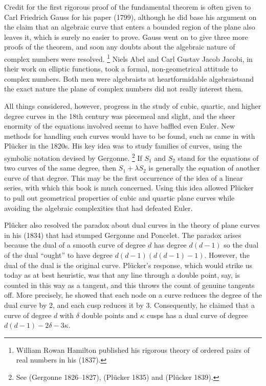 Credit for the first rigorous proof of the fundamental theorem is often
given to Carl Friedrich Gauss for his paper (1799), although he did
base his argument on the claim that an algebraic curve that enters a
bounded region of the plane also leaves it,  which is surely no easier
to prove.  Gauss went on to give three more proofs of the theorem,
and soon any doubts about the algebraic nature of complex numbers were
resolved.%
%
\footnote{William Rowan Hamilton published his rigorous theory
of ordered pairs of real numbers in his (1837).}
%
Niels Abel and Carl
Gustav Jacob Jacobi, in their work  on elliptic functions, took a formal,
non-geometrical attitude to complex numbers.  Both men were algebraists
at heart\emdash formidable algebraists\emdash and the exact nature the
plane of complex numbers did not really interest them.

All things considered, however, progress in the study of cubic, quartic,
and higher degree curves in the 18th century was piecemeal and slight, and
the sheer enormity of the equations involved seems to have baffled even
Euler. New methods for handling such curves would have to be found, such
as came in with Pl\"ucker in the 1820s. His key idea was to study families
of curves, using the symbolic notation devised by Gergonne.%
%
\footnote{See (Gergonne 1826--1827), (Pl\"ucker 1835) and (Pl\"ucker 1839).} 
%
If $S_1$
and $S_2$ stand for the equations of two curves of the same degree,
then $S_1 + \lambda S_2$ is generally the equation of another curve of
that degree. This may be the first occurrence of the idea of a linear
series, with which this book is much concerned. Using this idea allowed
Pl\"ucker to pull out geometrical properties of cubic and quartic plane
curves while avoiding the algebraic complexities that had defeated Euler.

Pl\"ucker also resolved the paradox about dual curves in the theory of
plane curves in his (1834) that had stumped Gergonne and Poncelet. The
paradox arises because the dual of a smooth curve of degree $d$ has
degree $d(d-1)$
so the dual of the dual ``ought'' to have degree
$d(d-1)(d(d-1)-1)$. However, the dual of the dual is the original curve.
Pl\"ucker's response, which would strike us today as at best heuristic,
was that any line through a double point, say, is counted in this way
as a tangent, and this throws the count of genuine tangents off. More
precisely, he  showed that each node on a curve reduces the degree
of the dual curve by 2, and each cusp reduces it by 3. Consequently,
he claimed that  a curve of degree $d$ with $\delta$ double points and
$\kappa$ cusps has a dual curve  of degree $d(d-1) -  2\delta - 3\kappa$.




